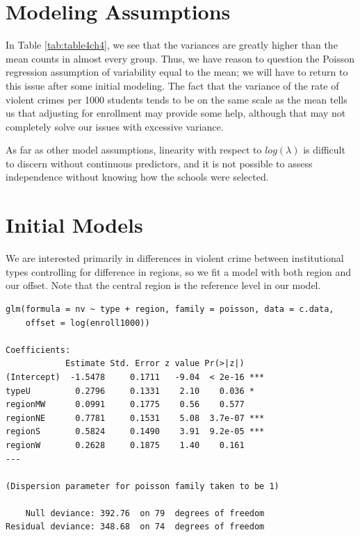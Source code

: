 \documentclass[
]{krantz}
\begin{document}
\hypertarget{modeling-assumptions}{%
\section{Modeling Assumptions}\label{modeling-assumptions}}

In Table \ref{tab:table4ch4}, we see that the variances are greatly higher than the mean counts in almost every group. Thus, we have reason to question the Poisson regression assumption of variability equal to the mean; we will have to return to this issue after some initial modeling. The fact that the variance of the rate of violent crimes per 1000 students tends to be on the same scale as the mean tells us that adjusting for enrollment may provide some help, although that may not completely solve our issues with excessive variance.

As far as other model assumptions, linearity with respect to \(log(\lambda)\) is difficult to discern without continuous predictors, and it is not possible to assess independence without knowing how the schools were selected.

\hypertarget{initial-models}{%
\section{Initial Models}\label{initial-models}}

We are interested primarily in differences in violent crime between institutional types controlling for difference in regions, so we fit a model with both region and our offset. Note that the central region is the reference level in our model.

\begin{verbatim}
glm(formula = nv ~ type + region, family = poisson, data = c.data, 
    offset = log(enroll1000))

Coefficients:
            Estimate Std. Error z value Pr(>|z|)    
(Intercept)  -1.5478     0.1711   -9.04  < 2e-16 ***
typeU         0.2796     0.1331    2.10    0.036 *  
regionMW      0.0991     0.1775    0.56    0.577    
regionNE      0.7781     0.1531    5.08  3.7e-07 ***
regionS       0.5824     0.1490    3.91  9.2e-05 ***
regionW       0.2628     0.1875    1.40    0.161    
---

(Dispersion parameter for poisson family taken to be 1)

    Null deviance: 392.76  on 79  degrees of freedom
Residual deviance: 348.68  on 74  degrees of freedom
\end{verbatim}
\end{document}
